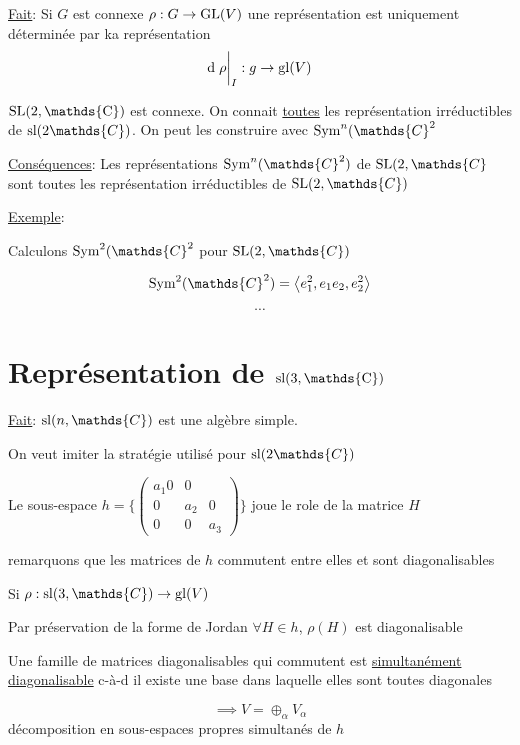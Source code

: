 \underline{Fait}: Si \(G\) est connexe \(\rho:G\to {\rm{}GL}(V)\) 
une représentation est uniquement déterminée par ka représentation \[ \dd \eval{\rho}_{I} : g \to {\rm{}gl}(V) \]

\({\rm{}SL(2, \mathds{C})}\) est connexe. On connait \underline{toutes} les représentation irréductibles de \({\rm{}sl}(2 \mathds{C}) \). On peut les construire avec \(\sym^{n}(\mathds{C}^2\) 

\underline{Conséquences}: Les représentations \(\sym^{n}(\mathds{C}^2) \) de \({\rm{}SL}(2, \mathds{C}\) sont toutes les représentation irréductibles de \({\rm{}SL}(2, \mathds{C})\)

\underline{Exemple}:

Calculons \(\sym^{2}(\mathds{C}^2\) pour \({\rm{}SL}(2, \mathds{C})\)

\[ \sym^{2}(\mathds{C}^2) = \expval{e_1^{2}, e_1 e_{2}, e_2^{2}} \]

\[ \dotsb \]

\section*{Représentation de \({\rm{}sl(3, \mathds{C})}\)}

\underline{Fait}: \({\rm{}sl}(n, \mathds{C})\) est une algèbre simple.

On veut imiter la stratégie utilisé pour \({\rm{}sl}(2 \mathds{C})\)


Le sous-espace  \(h = \{ \begin{pmatrix} a_1 0 & 0 \\ 0 & a_2 & 0 \\ 0 & 0 & a_3 \end{pmatrix}  \} \) joue le role de la matrice \(H\)

remarquons que les matrices de \(h\) commutent entre elles et sont diagonalisables 

Si \(\rho: {\rm{}sl}(3, \mathds{C}) \to {\rm{}gl}(V)\)

Par préservation de la forme de Jordan \( \forall H \in h\), \(\rho(H)\) est diagonalisable 

\begin{tcolorbox}[title=Rappel]
	Une famille de matrices diagonalisables qui commutent est \underline{simultanément diagonalisable} c-à-d il existe une base dans laquelle elles sont toutes diagonales 
\end{tcolorbox}

\[ \implies V = \oplus_{\alpha} V_\alpha \] décomposition en sous-espaces propres simultanés de \(h\)

